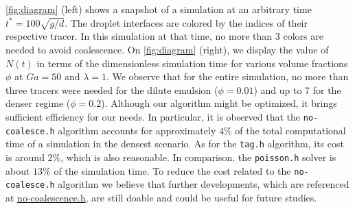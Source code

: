 \ref{fig:diagram} (left) shows a snapshot of a simulation at an arbitrary time $t^* = 100 \sqrt{g/d}$. 
The droplet interfaces are colored by the indices of their respective tracer. 
In this simulation at that time, no more than 3 colors are needed to avoid coalescence.
On \ref{fig:diagram} (right), we display the value of $N(t)$ in terms of the dimensionless simulation time for various volume fractions $\phi$ at $Ga = 50$ and  $\lambda = 1$. 
We observe that for the entire simulation, no more than three tracers were needed for the dilute emulsion ($\phi = 0.01$) and up to 7 for the denser regime ($\phi = 0.2$). 
Although our algorithm might be optimized, it brings sufficient efficiency for our needs. 
In particular, it is observed that the \texttt{no-coalesce.h} algorithm accounts for approximately $4\%$ of the total computational time of a simulation in the densest scenario. As for the \texttt{tag.h} algorithm, its cost is around $2\%$, which is also reasonable. In comparison, the \texttt{poisson.h} solver is about $13\%$ of the simulation time. 
To reduce the cost related to the \texttt{no-coalesce.h} algorithm we believe that further developments, which are referenced at \href{http://basilisk.fr/sandbox/fintzin/Rising-Suspenion/no-coalescence.h}{no-coalescence.h}, are still doable and could be useful for future studies.


